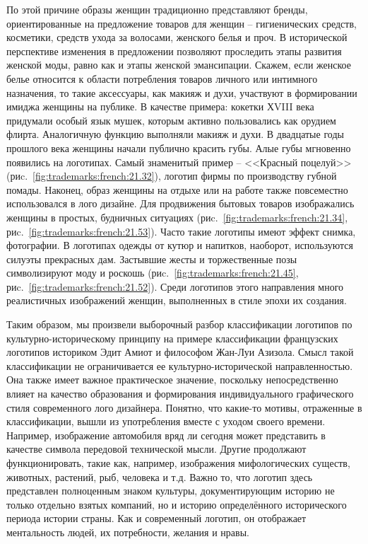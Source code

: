 \begin{enumerate}
\begin{enumerate}
\begin{enumerate}
      По этой причине образы женщин традиционно представляют бренды, ориентированные
      на предложение товаров для женщин -- гигиенических средств, косметики, средств
      ухода за волосами, женского белья и проч. В исторической перспективе изменения в
      предложении позволяют проследить этапы развития женской моды, равно как и этапы
      женской эмансипации. Скажем, если женское белье относится к области потребления
      товаров личного или интимного назначения, то такие аксессуары, как макияж и
      духи, участвуют в формировании имиджа женщины на публике. В качестве примера:
      кокетки ХVIII века придумали особый язык мушек, которым активно пользовались как
      орудием флирта. Аналогичную функцию выполняли макияж и духи. В двадцатые годы
      прошлого века женщины начали публично красить губы. Алые губы мгновенно
      появились на логотипах. Самый знаменитый пример -- <<Красный поцелуй>> (риc.~\ref{fig:trademarks:french:21.32}),
      логотип фирмы по производству губной помады. Наконец, образ женщины на отдыхе
      или на работе также повсеместно использовался в лого дизайне. Для продвижения
      бытовых товаров изображались женщины в простых, будничных ситуациях (риc.~\ref{fig:trademarks:french:21.34},
      риc.~\ref{fig:trademarks:french:21.53}). Часто такие логотипы имеют эффект снимка, фотографии. В логотипах одежды
      от кутюр и напитков, наоборот, используются силуэты прекрасных дам. Застывшие
      жесты и торжественные позы символизируют моду и роскошь
      (риc.~\ref{fig:trademarks:french:21.45}, риc.~\ref{fig:trademarks:french:21.52}). Среди
      логотипов этого направления много реалистичных изображений женщин, выполненных в
      стиле эпохи их создания.
    \end{enumerate}
  \end{enumerate}
\end{enumerate}

Таким образом, мы произвели выборочный разбор классификации логотипов по
культурно-историческому принципу на примере классификации французских
логотипов историком Эдит Амиот и философом Жан-Луи Азизола. Смысл такой
классификации не ограничивается ее культурно-исторической направленностью.
Она также имеет важное практическое значение, поскольку непосредственно
влияет на качество образования и формирования индивидуального графического
стиля современного лого дизайнера. Понятно, что какие-то мотивы, отраженные
в классификации, вышли из употребления вместе с уходом своего времени.
Например, изображение автомобиля вряд ли сегодня может представить в качестве
символа передовой технической мысли. Другие продолжают функционировать,
такие как, например, изображения мифологических существ, животных, растений,
рыб, человека и т.д. Важно то, что логотип здесь представлен полноценным
знаком культуры, документирующим историю не только отдельно взятых компаний,
но и историю определённого исторического периода истории страны. Как и
современный логотип, он отображает ментальность людей, их потребности,
желания и нравы.

